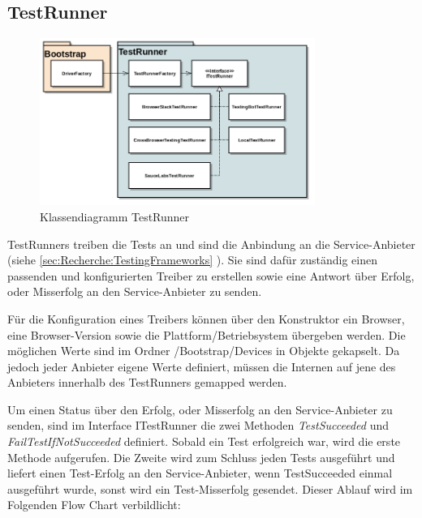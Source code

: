 \subsection{TestRunner}
\label{sec:umsetzung:architektur:testrunner}
\begin{figure}[H]
	\centering
	\includegraphics[width=0.8\textwidth]{images/semesterarbeit class diagram - testrunner.png}
	\caption{Klassendiagramm TestRunner}
	\label{fig:umsetzung:architektur:testrunners}
\end{figure}
TestRunners treiben die Tests an und sind die Anbindung an die Service-Anbieter (siehe \cref{sec:Recherche:TestingFrameworks} ). Sie sind dafür zuständig einen passenden und konfigurierten Treiber zu erstellen sowie eine Antwort über Erfolg, oder Misserfolg an den Service-Anbieter zu senden.

Für die Konfiguration eines Treibers können über den Konstruktor ein Browser, eine Browser-Version sowie die Plattform/Betriebsystem übergeben werden. Die möglichen Werte sind im Ordner /Bootstrap/Devices in Objekte gekapselt. Da jedoch jeder Anbieter eigene Werte definiert, müssen die Internen auf jene des Anbieters innerhalb des TestRunners gemapped werden.

Um einen Status über den Erfolg, oder Misserfolg an den Service-Anbieter zu senden, sind im Interface ITestRunner die zwei Methoden \textit{TestSucceeded} und \textit{FailTestIfNotSucceeded} definiert. Sobald ein Test erfolgreich war, wird die erste Methode aufgerufen. Die Zweite wird zum Schluss jeden Tests ausgeführt und liefert einen Test-Erfolg an den Service-Anbieter, wenn TestSucceeded einmal ausgeführt wurde, sonst wird ein Test-Misserfolg gesendet. Dieser Ablauf wird im Folgenden Flow Chart verbildlicht:

